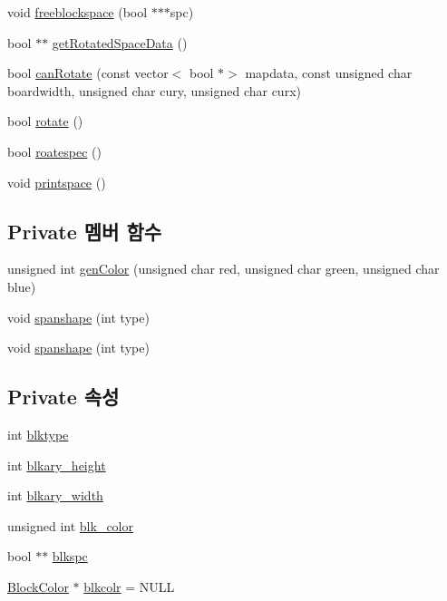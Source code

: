 \begin{DoxyCompactItemize}
\item 
void \hyperlink{class_tetris_1_1_block_aea78e0a1b229842f541a8e897e2e9340}{freeblockspace} (bool $\ast$$\ast$$\ast$spc)
\item 
bool $\ast$$\ast$ \hyperlink{class_tetris_1_1_block_ada769278572785b24e8a91f620b97b81}{get\+Rotated\+Space\+Data} ()
\item 
bool \hyperlink{class_tetris_1_1_block_a56d194d0a5d56d2d1220ec32774cea38}{can\+Rotate} (const vector$<$ bool $\ast$$>$ mapdata, const unsigned char boardwidth, unsigned char cury, unsigned char curx)
\item 
bool \hyperlink{class_tetris_1_1_block_a0d1eb57e6da91832ad983f7a4fa9ca04}{rotate} ()
\item 
bool \hyperlink{class_tetris_1_1_block_a787424e5e9ec2807989121e8dcee1a7a}{roatespec} ()
\item 
void \hyperlink{class_tetris_1_1_block_ae7aadeec449fec232e9635d839593028}{printspace} ()
\end{DoxyCompactItemize}
\subsection*{Private 멤버 함수}
\begin{DoxyCompactItemize}
\item 
unsigned int \hyperlink{class_tetris_1_1_block_a7362b9c1679a87823590a3c20ca53a55}{gen\+Color} (unsigned char red, unsigned char green, unsigned char blue)
\item 
void \hyperlink{class_tetris_1_1_block_ad683f161157c16b80d5df8929bca468c}{spanshape} (int type)
\item 
void \hyperlink{class_tetris_1_1_block_ad683f161157c16b80d5df8929bca468c}{spanshape} (int type)
\end{DoxyCompactItemize}
\subsection*{Private 속성}
\begin{DoxyCompactItemize}
\item 
int \hyperlink{class_tetris_1_1_block_aceac58dcf8d8afaa82c2bab101cb3cff}{blktype}
\item 
int \hyperlink{class_tetris_1_1_block_abbea7737c2b1fb7339aab4dff13de27c}{blkary\+\_\+height}
\item 
int \hyperlink{class_tetris_1_1_block_a96548cab58eb788af744b54192c7bea1}{blkary\+\_\+width}
\item 
unsigned int \hyperlink{class_tetris_1_1_block_acf78e864526e38c9c72fa0b012d5b344}{blk\+\_\+color}
\item 
bool $\ast$$\ast$ \hyperlink{class_tetris_1_1_block_af2f96c83a3511d32321672f794aa4db1}{blkspc}
\item 
\hyperlink{class_tetris_1_1_block_sub_modules_1_1_block_color}{Block\+Color} $\ast$ \hyperlink{class_tetris_1_1_block_ab7cfb062eb49e791c94bac4a2e7a7ca9}{blkcolr} = N\+U\+LL
\end{DoxyCompactItemize}



